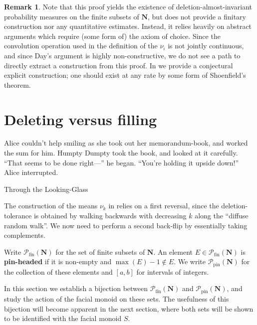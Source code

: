 \documentclass[12pt, pdflatex]{amsart}
\theoremstyle{definition}
\newtheorem{remark}[theorem]{Remark}
\numberwithin{equation}{section}
\numberwithin{theorem}{section}
\newcommand{\NN}{\mathbf{N}}
\newcommand{\sPf}{\mathscr{P}_\mathrm{fin}}
\newcommand{\sPt}{\mathscr{P}_\mathrm{pin}}
\begin{document}
\begin{remark}
Note that this proof yields the existence of deletion-almost-invariant probability measures on the finite subsets of $\NN$, but does not provide a finitary construction nor any quantitative estimates. Instead, it relies heavily on abstract arguments which require (some form of) the axiom of choice. Since the convolution operation used in the definition of the $\nu_i$ is not jointly continuous, and since Day's argument is highly non-constructive, we do not see a path to directly extract a construction from this proof. In  we provide a conjectural explicit construction; one should exist at any rate by some form of Shoenfield's theorem.
\end{remark}

\section{Deleting versus filling}\label{sec:up-down}
%
\begin{flushright}
\begin{minipage}[t]{0.9\linewidth}\itshape\small
\begin{flushright}
Alice couldn’t help smiling as she took out her memorandum-book, and worked the sum for him. Humpty Dumpty took the book, and looked at it carefully. ``That seems to be done right---'' he began. ``You're holding it upside down!'' Alice interrupted. 
\end{flushright}
\begin{flushright}
\upshape\small
Through the Looking-Glass~\cite[Chap.~VI]{Carroll1872}
\end{flushright}
\end{minipage}
 \end{flushright}
%
The construction of the means $\nu_k$ in  relies on a first reversal, since the deletion-tolerance is obtained by walking backwards with decreasing $k$ along the ``diffuse random walk''. We now need to perform a second back-flip by essentially taking complements.

Write $\sPf(\NN)$ for the set of finite subsets of $\NN$. An element $E\in \sPf(\NN)$ is \textbf{pin-headed} if it is non-empty and $\max(E) -1 \notin E$. We write $\sPt(\NN)$ for the collection of these elements and $[a,b]$ for intervals of integers.

In this section we establish a bijection between $\sPf(\NN)$ and $\sPt(\NN)$, and study the action of the facial monoid on these sets. The usefulness of this bijection will become apparent in the next section, where both sets will be shown to be identified with the facial monoid $S$.
\end{document}
